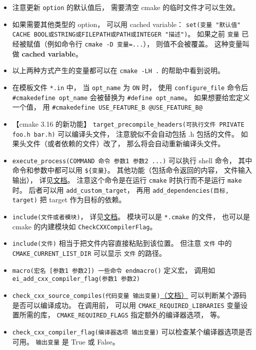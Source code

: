 \begin{itemize}
\item 注意更新 \verb`option` 的默认值后， 需要清空 cmake 的临时文件才可以生效。
\item 如果需要其他类型的 option， 可以用 cached variable： \verb`set(变量 "默认值" CACHE BOOL或STRING或FILEPATH或PATH或INTEGER "描述")`。 如果之前 \verb`变量` 已经被赋值（例如命令行 \verb`cmake -D 变量=...`）， 则值不会被覆盖。 这种变量叫做 \textbf{cached variable}。
\item 以上两种方式产生的变量都可以在 \verb`cmake -LH .` 的帮助中看到说明。
\item 在模板文件 \verb`*.in` 中， 当 \verb`opt_name` 为 \verb`ON` 时， 使用 \verb`configure_file` 命令后 \verb`#cmakedefine opt_name` 会被替换为 \verb`#define opt_name`。 如果想要给宏定义一个值， 用 \verb`#cmakedefine USE_FEATURE_B @USE_FEATURE_B@`
\item 【cmake 3.16 的新功能】 \verb`target_precompile_headers(可执行文件 PRIVATE foo.h bar.h)` 可以编译头文件， 注意貌似不会自动包括 .h 包括的文件。 如果头文件（或者依赖的文件）改了， 那么将会自动重新编译头文件。
\item \verb`execute_process(COMMAND 命令 参数1 参数2 ...)` 可以执行 shell 命令， 其中命令和参数中都可以用 \verb`${变量}`。 其他功能（包括命令返回的内容， 文件输入输出）， 详见\href{https://cmake.org/cmake/help/latest/command/execute_process.html}{文档}。 注意这个命令是在运行 \verb`cmake` 时执行而不是运行 \verb`make` 时。 后者可以用 \verb`add_custom_target`， 再用 \verb`add_dependencies(目标, target)` 把 target 作为目标的依赖。
\item \verb`include(文件或者模块)`， 详见\href{https://cmake.org/cmake/help/latest/command/include.html}{文档}。 模块可以是 \verb`*.cmake` 的文件， 也可以是 cmake 的内建模块如 \verb`CheckCXXCompilerFlag`。
\item \verb`include(文件)` 相当于把文件内容直接粘贴到该位置。 但注意 \verb`文件` 中的 \verb`CMAKE_CURRENT_LIST_DIR` 可以显示 \verb`文件` 的路径。
\item \verb`macro(宏名 [参数1 参数2]) 一些命令 endmacro()` 定义宏， 调用如 \verb`ei_add_cxx_compiler_flag(参数1 参数2)`
\item \verb`check_cxx_source_compiles(代码变量 输出变量)`\href{https://cmake.org/cmake/help/latest/module/CheckCXXSourceCompiles.html}{（文档）} 可以判断某个源码是否可以编译成功。 在调用前， 可以用 \verb`CMAKE_REQUIRED_LIBRARIES` 变量设置所需的库， \verb`CMAKE_REQUIRED_FLAGS` 指定额外的编译器选项， 等。
\item \verb`check_cxx_compiler_flag(编译器选项 输出变量)` 可以检查某个编译器选项是否可用。 \verb`输出变量` 是 True 或 False。

\end{itemize}
